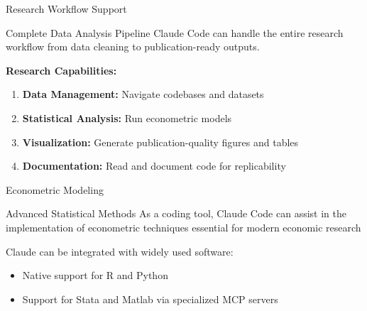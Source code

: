 \documentclass[9pt]{beamer}
\begin{document}
	\begin{frame}{Research Workflow Support}
		\begin{exampleblock}{Complete Data Analysis Pipeline}
			Claude Code can handle the entire research workflow from data cleaning to publication-ready outputs.
		\end{exampleblock}
		
		\vspace{0.3cm}
		
		\textbf{Research Capabilities:}
		\begin{enumerate}
			\item \textbf{Data Management:} Navigate codebases and datasets
			\item \textbf{Statistical Analysis:} Run econometric models
			\item \textbf{Visualization:} Generate publication-quality figures and tables
			\item \textbf{Documentation:} Read and document code for replicability
		\end{enumerate}
	\end{frame}
	
	\begin{frame}[fragile]{Econometric Modeling}
		\begin{alertblock}{Advanced Statistical Methods}
			As a coding tool, Claude Code can assist in the implementation of econometric techniques essential for modern economic research
		\end{alertblock}
		
		\vspace{0.5cm}
		
		Claude can be integrated with widely used software:
		\begin{itemize}
			\item Native support for R and Python
			\item Support for Stata and Matlab via specialized MCP servers
		\end{itemize}
	\end{frame}
	
\end{document}
